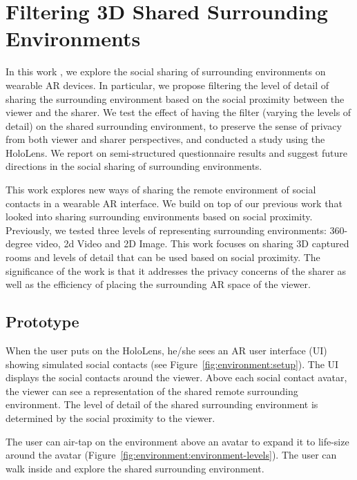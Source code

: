 \section{Filtering 3D Shared Surrounding Environments}
\label{sec:surrounding:environment}

In this work \cite{Nassani2018b}, we explore the social sharing of surrounding environments on wearable AR devices. In particular, we propose filtering the level of detail of sharing the surrounding environment based on the social proximity between the viewer and the sharer. We test the effect of having the filter (varying the levels of detail) on the shared surrounding environment, to preserve the sense of privacy from both viewer and sharer perspectives, and conducted a study using the HoloLens. We report on semi-structured questionnaire results and suggest future directions in the social sharing of surrounding environments.

This work explores new ways of sharing the remote environment of social contacts in a wearable AR interface. We build on top of our previous work \cite{Nassani2018a} that looked into sharing surrounding environments based on social proximity. Previously, we tested three levels of representing surrounding environments: 360-degree video, 2d Video and 2D Image. This work focuses on sharing 3D captured rooms and levels of detail that can be used based on social proximity. The significance of the work is that it addresses the privacy concerns of the sharer as well as the efficiency of placing the surrounding AR space of the viewer.

\subsection{Prototype}

When the user puts on the HoloLens, he/she sees an AR user interface (UI) showing simulated social contacts (see Figure~\ref{fig:environment:setup}). The UI displays the social contacts around the viewer. Above each social contact avatar, the viewer can see a representation of the shared remote surrounding environment. The level of detail of the shared surrounding environment is determined by the social proximity to the viewer.

The user can air-tap on the environment above an avatar to expand it to life-size around the avatar (Figure~\ref{fig:environment:environment-levels}). The user can walk inside and explore the shared surrounding environment.

